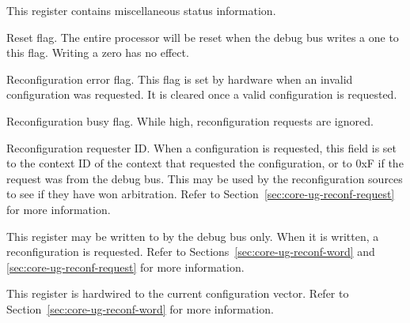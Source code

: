 

This register contains miscellaneous status information.

\debugCanWrite{}
Reset flag. The entire \rvex{} processor will be reset when the debug bus writes
a one to this flag. Writing a zero has no effect.

Reconfiguration error flag. This flag is set by hardware when an invalid
configuration was requested. It is cleared once a valid configuration is
requested.

Reconfiguration busy flag. While high, reconfiguration requests are ignored.

Reconfiguration requester ID. When a configuration is requested, this field is
set to the context ID of the context that requested the configuration, or to
0xF if the request was from the debug bus. This may be used by the
reconfiguration sources to see if they have won arbitration. Refer to
Section~\ref{sec:core-ug-reconf-request} for more information.


This register may be written to by the debug bus only. When it is written, a
reconfiguration is requested. Refer to Sections~\ref{sec:core-ug-reconf-word}
and \ref{sec:core-ug-reconf-request} for more information.

\debugCanWrite{}


This register is hardwired to the current configuration vector. Refer to
Section~\ref{sec:core-ug-reconf-word} for more information.



